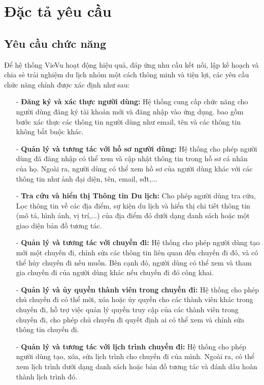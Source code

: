 \section{Đặc tả yêu cầu}

\subsection{Yêu cầu chức năng}

Để hệ thống VieVu hoạt động hiệu quả, đáp ứng nhu cầu kết nối, lập kế hoạch và chia sẻ trải nghiệm du lịch nhóm một cách thông minh và tiện lợi, các yêu cầu chức năng chính được xác định như sau:

\begin{itemize}
    \item[-] \textbf{Đăng ký và xác thực người dùng:} Hệ thống cung cấp chức năng cho người dùng đăng ký tài khoản mới và đăng nhập vào ứng dụng. bao gồm bước xác thực các thông tin người dùng như email, tên và các thông tin không bắt buộc khác.
    \item[-] \textbf{Quản lý và tương tác với hồ sơ người dùng:} Hệ thống cho phép người dùng đã đăng nhập có thể xem và cập nhật thông tin trong hồ sơ cá nhân của họ. Ngoài ra, người dùng có thể xem hồ sơ của người dùng khác với các thông tin như ảnh đại diện, tên, email, sđt,...
    \item[-] \textbf{Tra cứu và hiển thị Thông tin Du lịch:} Cho phép người dùng tra cứu, Lọc thông tin về các địa điểm, sự kiện du lịch và hiển thị chi tiết thông tin (mô tả, hình ảnh, vị trí,...) của địa điểm đó dưới dạng danh sách hoặc một giao diện bản đồ tương tác.
    \item[-] \textbf{Quản lý và tương tác với chuyến đi:} Hệ thống cho phép người dùng tạo mới một chuyến đi, chỉnh sửa các thông tin liên quan đến chuyến đi đó, và có thể hủy chuyến đi nếu muốn. Bên cạnh đó, người dùng có thể xem và tham gia chuyến đi của người dùng khác nếu chuyến đi đó công khai.
    \item[-] \textbf{Quản lý và ủy quyền thành viên trong chuyến đi:} Hệ thống cho phép chủ chuyến đi có thể mời, xóa hoặc ủy quyền cho các thành viên khác trong chuyến đi, hỗ trợ việc quản lý quyền truy cập của các thành viên trong chuyến đi, cho phép chủ chuyến đi quyết định ai có thể xem và chỉnh sửa thông tin chuyến đi.
    \item[-] \textbf{Quản lý và tương tác với lịch trình chuyến đi:} Hệ thống cho phép người dùng tạo, xóa, sửa lịch trình cho chuyến đi của mình. Ngoài ra, có thể xem lịch trình dưới dạng danh sách hoặc bản đồ tương tác và đánh dấu hoàn thành lịch trình đó.

\end{itemize}
